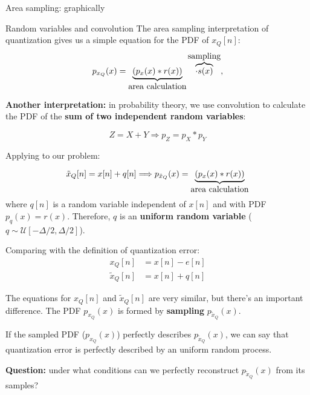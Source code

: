 %
\begin{frame}{Area sampling: graphically}
\begin{center}
	\resizebox{0.9\textwidth}{!}{}
\end{center}	
\end{frame}

%
\begin{frame}{Random variables and convolution}
The area sampling interpretation of quantization gives us a simple equation for the PDF of $x_Q[n]$:
\begin{equation*}
p_{x_Q}(x) = \underbrace{(p_x(x) \ast r(x))}_{\text{\normalsize area calculation}}\overbrace{\cdot s(x)}^{\text{\normalsize sampling}},
\end{equation*}

\pause
\textbf{Another interpretation:} in probability theory, we use convolution to calculate the PDF of the \textbf{sum of two independent random variables}:

\begin{equation*}
Z = X + Y \Longrightarrow p_Z = p_X \ast p_Y
\end{equation*}

\pause
Applying to our problem:

\begin{equation*}
\tilde{x}_Q[n] = x[n] + q[n] \Longrightarrow p_{\tilde{x}_Q}(x) = \underbrace{(p_x(x) \ast r(x))}_{\text{\normalsize area calculation}}
\end{equation*}
where $q[n]$ is a random variable independent of $x[n]$ and with PDF $p_q(x) = r(x)$. Therefore, $q$ is an \textbf{uniform random variable} ($q\sim\mathcal{U}[-\Delta/2, \Delta/2]$).
\end{frame}

%
\begin{frame}
Comparing with the definition of quantization error:
\begin{align*}
x_Q[n] &= x[n] - e[n] \tag{from definition of quantization error} \\
\tilde{x}_Q[n] &= x[n] + q[n] \tag{from probabilistic interpreation of area sampling}
\end{align*}

The equations for $x_Q[n]$ and $\tilde{x}_Q[n]$ are very similar, but there's an important difference. The PDF $p_{x_Q}(x)$ is formed by \textbf{sampling} $p_{\tilde{x}_Q}(x)$.

\pause
\begin{center}
	\resizebox{0.55\textwidth}{!}{}
\end{center}

\pause
If the sampled PDF ($p_{x_Q}(x)$) perfectly describes $p_{\tilde{x}_Q}(x)$, we can say that quantization error is perfectly described by an uniform random process.

\pause 
\textbf{Question:}  under what conditions can we perfectly reconstruct $p_{\tilde{x}_Q}(x)$ from its samples? \\
\end{frame}

